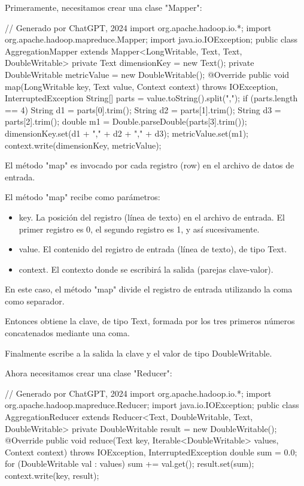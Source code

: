 Primeramente, necesitamos crear una clase "Mapper":

\begin{SourceCode}
// Generado por ChatGPT, 2024
import org.apache.hadoop.io.*;
import org.apache.hadoop.mapreduce.Mapper;
import java.io.IOException;
public class AggregationMapper extends Mapper<LongWritable, Text, Text, DoubleWritable> {
private Text dimensionKey = new Text();
private DoubleWritable metricValue = new DoubleWritable();
@Override
public void map(LongWritable key, Text value, Context context) throws IOException, InterruptedException {
String[] parts = value.toString().split(",");
if (parts.length == 4) {
    String d1 = parts[0].trim();
    String d2 = parts[1].trim();
    String d3 = parts[2].trim();
    double m1 = Double.parseDouble(parts[3].trim());
    dimensionKey.set(d1 + "," + d2 + "," + d3);
    metricValue.set(m1);
    context.write(dimensionKey, metricValue);
}
}
}
\end{SourceCode}

El método "map" es invocado por cada registro (row) en el archivo de datos de entrada.

El método "map" recibe como parámetros:

\begin{itemize}
\item key. La posición del registro (línea de texto) en el archivo de entrada. El primer registro es 0, el segundo registro es 1, y así sucesivamente.
\item value. El contenido del registro de entrada (línea de texto), de tipo Text.
\item context. El contexto donde se escribirá la salida (parejas clave-valor).
\end{itemize}

En este caso, el método "map" divide el registro de entrada utilizando la coma como separador.

Entonces obtiene la clave, de tipo Text, formada por los tres primeros números concatenados mediante una coma.

Finalmente escribe a la salida la clave y el valor de tipo DoubleWritable.

Ahora necesitamos crear una clase "Reducer":

\begin{SourceCode}
// Generado por ChatGPT, 2024
import org.apache.hadoop.io.*;
import org.apache.hadoop.mapreduce.Reducer;
import java.io.IOException;
public class AggregationReducer extends Reducer<Text, DoubleWritable, Text, DoubleWritable>{
  private DoubleWritable result = new DoubleWritable();
  @Override
  public void reduce(Text key, Iterable<DoubleWritable> values, Context context) throws IOException, InterruptedException {
double sum = 0.0;
for (DoubleWritable val : values) {
  sum += val.get();
}
result.set(sum);
context.write(key, result);
  }
}
\end{SourceCode}

